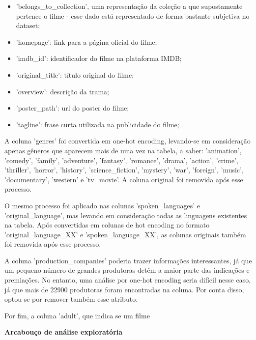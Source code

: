             \begin{itemize}
                \item 'belongs\_to\_collection', uma representação da coleção a que supostamente pertence o filme - esse dado está representado de forma bastante subjetiva no dataset;
                \item 'homepage': link para a página oficial do filme;
                \item 'imdb\_id': identificador do filme na plataforma IMDB;
                \item 'original\_title': título original do filme;
                \item 'overview': descrição da trama;
                \item 'poster\_path': url do poster do filme;
                \item 'tagline': frase curta utilizada na publicidade do filme;
            \end{itemize}

            A coluna 'genres' foi convertida em one-hot encoding, levando-se em consideração apenas gêneros que aparecem mais de uma vez na tabela, a saber: 'animation', 'comedy', 'family', 'adventure', 'fantasy', 'romance', 'drama', 'action', 'crime', 'thriller', 'horror', 'history', 'science\_fiction', 'mystery', 'war', 'foreign', 'music', 'documentary', 'western' e 'tv\_movie'. A coluna original foi removida após esse processo.

            O mesmo processo foi aplicado nas colunas 'spoken\_languages' e 'original\_language', mas levando em consideração todas as linguagens existentes na tabela. Após convertidas em colunas de hot encoding no formato 'original\_language_XX' e 'spoken\_language\_XX', as colunas originais também foi removida após esse processo.

            A coluna 'production\_companies' poderia trazer informações interessantes, já que um pequeno número de grandes produtoras detêm a maior parte das indicações e premiações\cite{argon2020}. No entanto, uma análise por one-hot encoding seria difícil nesse caso, já que mais de 22900 produtoras foram encontradas na coluna. Por conta disso, optou-se por remover também esse atributo.\newline

            Por fim, a coluna 'adult', que indica se um filme \newline

            \textbf{Arcabouço de análise exploratória}\par

